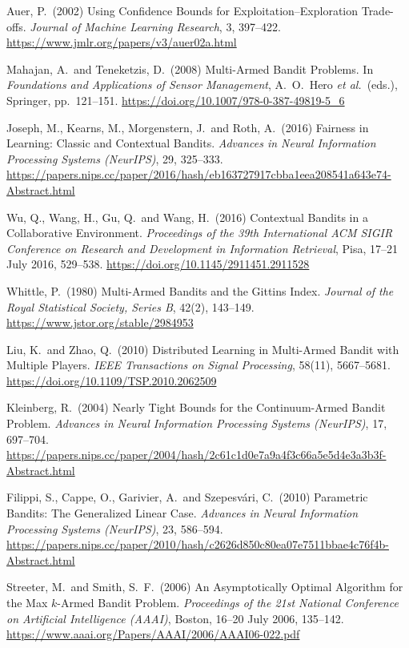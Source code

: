 \begin{enumerate}[label={[\arabic*]},
                  leftmargin=2.8em,
                  labelwidth=2.4em,
                  labelsep=0.4em,
                  itemsep=6pt,
                  align=left]
\item Auer, P.\ (2002) Using Confidence Bounds for Exploitation--Exploration Trade-offs. \textit{Journal of Machine Learning Research}, 3, 397--422. \url{https://www.jmlr.org/papers/v3/auer02a.html}

\item Mahajan, A.\ and Teneketzis, D.\ (2008) Multi-Armed Bandit Problems. In \textit{Foundations and Applications of Sensor Management}, A.~O.~Hero \textit{et al.}\ (eds.), Springer, pp.~121--151. \url{https://doi.org/10.1007/978-0-387-49819-5_6}

\item Joseph, M., Kearns, M., Morgenstern, J.\ and Roth, A.\ (2016) Fairness in Learning: Classic and Contextual Bandits. \textit{Advances in Neural Information Processing Systems (NeurIPS)}, 29, 325--333. \url{https://papers.nips.cc/paper/2016/hash/eb163727917cbba1eea208541a643e74-Abstract.html}

\item Wu, Q., Wang, H., Gu, Q.\ and Wang, H.\ (2016) Contextual Bandits in a Collaborative Environment. \textit{Proceedings of the 39th International ACM SIGIR Conference on Research and Development in Information Retrieval}, Pisa, 17--21 July 2016, 529--538. \url{https://doi.org/10.1145/2911451.2911528}

\item Whittle, P.\ (1980) Multi-Armed Bandits and the Gittins Index. \textit{Journal of the Royal Statistical Society, Series B}, 42(2), 143--149. \url{https://www.jstor.org/stable/2984953}

\item Liu, K.\ and Zhao, Q.\ (2010) Distributed Learning in Multi-Armed Bandit with Multiple Players. \textit{IEEE Transactions on Signal Processing}, 58(11), 5667--5681. \url{https://doi.org/10.1109/TSP.2010.2062509}

\item Kleinberg, R.\ (2004) Nearly Tight Bounds for the Continuum-Armed Bandit Problem. \textit{Advances in Neural Information Processing Systems (NeurIPS)}, 17, 697--704. \url{https://papers.nips.cc/paper/2004/hash/2c61c1d0e7a9a4f3c66a5e5d4e3a3b3f-Abstract.html}

\item Filippi, S., Cappe, O., Garivier, A.\ and Szepesv\'ari, C.\ (2010) Parametric Bandits: The Generalized Linear Case. \textit{Advances in Neural Information Processing Systems (NeurIPS)}, 23, 586--594. \url{https://papers.nips.cc/paper/2010/hash/c2626d850c80ea07e7511bbae4c76f4b-Abstract.html}

\item Streeter, M.\ and Smith, S.~F.\ (2006) An Asymptotically Optimal Algorithm for the Max $k$-Armed Bandit Problem. \textit{Proceedings of the 21st National Conference on Artificial Intelligence (AAAI)}, Boston, 16--20 July 2006, 135--142. \url{https://www.aaai.org/Papers/AAAI/2006/AAAI06-022.pdf}

\end{enumerate}
\newpage
